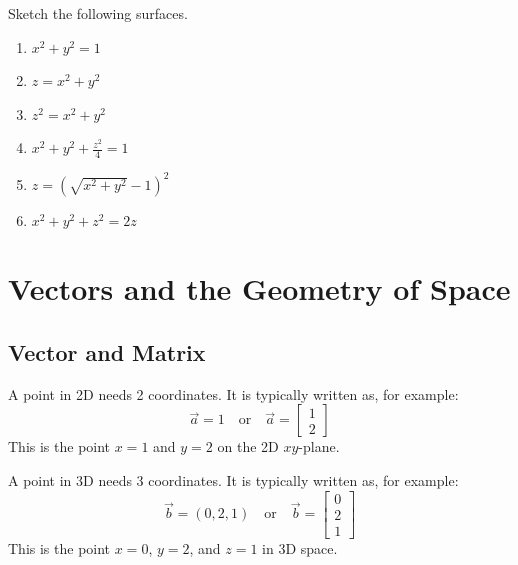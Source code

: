 \documentclass[11pt,fleqn]{book} %
\begin{document}
\begin{exercise}
    Sketch the following surfaces.

    \begin{minipage}[t]{0.45\linewidth} 
        \begin{enumerate}
            \item $x^2 + y^2 = 1$

            \item $z = x^2 + y^2$

            \item $z^2 = x^2 + y^2$
        \end{enumerate}
    \end{minipage}
    \begin{minipage}[t]{0.45\linewidth} 
        \begin{enumerate} \setcounter{enumi}{3}
            \item $x^2 + y^2 + \frac{z^2}{4} = 1$
            \item $z = \left( \sqrt{x^2 + y^2} - 1 \right)^2$
            \item $x^2 + y^2 + z^2 = 2z$
        \end{enumerate}
    \end{minipage}
\end{exercise}


\chapter{Vectors and the Geometry of Space}

\section{Vector and Matrix}

A point in 2D needs 2 coordinates. It is typically written as, for example: $$\vec{a} = 1 \quad\text{or}\quad \vec{a} = \begin{bmatrix} 1 \\ 2 \end{bmatrix}$$ This is the point $x = 1$ and $y = 2$ on the 2D $xy$-plane.

A point in 3D needs 3 coordinates. It is typically written as, for example: $$\vec{b} = (0, 2, 1) \quad\text{or}\quad \vec{b} = \begin{bmatrix} 0 \\ 2 \\ 1 \end{bmatrix}$$ This is the point $x = 0$, $y = 2$, and $z = 1$ in 3D space.
\end{document}
